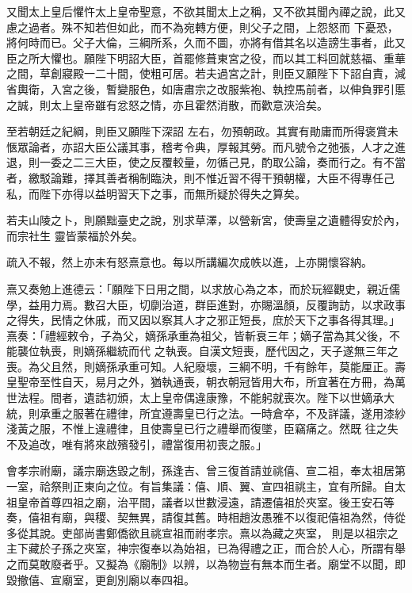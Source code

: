 \begin{pinyinscope}
 又聞太上皇后懼忤太上皇帝聖意，不欲其聞太上之稱，又不欲其聞內禪之說，此又慮之過者。殊不知若但如此，而不為宛轉方便，則父子之間，上怨怒而
 下憂恐，將何時而已。父子大倫，三綱所系，久而不圖，亦將有借其名以造謗生事者，此又臣之所大懼也。願陛下明詔大臣，首罷修葺東宮之役，而以其工料回就慈福、重華之間，草創寢殿一二十間，使粗可居。若夫過宮之計，則臣又願陛下下詔自責，減省輿衛，入宮之後，暫變服色，如唐肅宗之改服紫袍、執控馬前者，以伸負罪引慝之誠，則太上皇帝雖有忿怒之情，亦且霍然消散，而歡意浹洽矣。



 至若朝廷之紀綱，則臣又願陛下深詔
 左右，勿預朝政。其實有勛庸而所得褒賞未愜眾論者，亦詔大臣公議其事，稽考令典，厚報其勞。而凡號令之弛張，人才之進退，則一委之二三大臣，使之反覆較量，勿循己見，酌取公論，奏而行之。有不當者，繳駁論難，擇其善者稱制臨決，則不惟近習不得干預朝權，大臣不得專任己私，而陛下亦得以益明習天下之事，而無所疑於得失之算矣。



 若夫山陵之卜，則願黜臺史之說，別求草澤，以營新宮，使壽皇之遺體得安於內，而宗社生
 靈皆蒙福於外矣。



 疏入不報，然上亦未有怒熹意也。每以所講編次成帙以進，上亦開懷容納。



 熹又奏勉上進德云：「願陛下日用之間，以求放心為之本，而於玩經觀史，親近儒學，益用力焉。數召大臣，切劘治道，群臣進對，亦賜溫顏，反覆詢訪，以求政事之得失，民情之休戚，而又因以察其人才之邪正短長，庶於天下之事各得其理。」熹奏：「禮經敕令，子為父，嫡孫承重為祖父，皆斬衰三年；嫡子當為其父後，不能襲位執喪，則嫡孫繼統而代
 之執喪。自漢文短喪，歷代因之，天子遂無三年之喪。為父且然，則嫡孫承重可知。人紀廢壞，三綱不明，千有餘年，莫能厘正。壽皇聖帝至性自天，易月之外，猶執通喪，朝衣朝冠皆用大布，所宜著在方冊，為萬世法程。間者，遺誥初頒，太上皇帝偶違康豫，不能躬就喪次。陛下以世嫡承大統，則承重之服著在禮律，所宜遵壽皇已行之法。一時倉卒，不及詳議，遂用漆紗淺黃之服，不惟上違禮律，且使壽皇已行之禮舉而復墜，臣竊痛之。然既
 往之失不及追改，唯有將來啟殯發引，禮當復用初喪之服。」



 會孝宗祔廟，議宗廟迭毀之制，孫逢吉、曾三復首請並祧僖、宣二祖，奉太祖居第一室，祫祭則正東向之位。有旨集議：僖、順、翼、宣四祖祧主，宜有所歸。自太祖皇帝首尊四祖之廟，治平間，議者以世數浸遠，請遷僖祖於夾室。後王安石等奏，僖祖有廟，與稷、契無異，請復其舊。時相趙汝愚雅不以復祀僖祖為然，侍從多從其說。吏部尚書鄭僑欲且祧宣祖而祔孝宗。熹以為藏之夾室，
 則是以祖宗之主下藏於子孫之夾室，神宗復奉以為始祖，已為得禮之正，而合於人心，所謂有舉之而莫敢廢者乎。又擬為《廟制》以辨，以為物豈有無本而生者。廟堂不以聞，即毀撤僖、宣廟室，更創別廟以奉四祖。




\end{pinyinscope}
